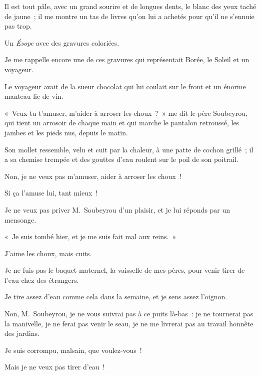 \documentclass[french,twoside]{book} %
\def\mednobreak{\ifdim\lastskip<\medskipamount
  \removelastskip\nopagebreak\medskip\fi}
\newcommand{\labelblock}[1]{\medbreak{\noindent\color{rubric}\bfseries #1}\par\mednobreak}
\begin{document}
Il est tout pâle, avec un grand sourire et de longues dents, le blanc des yeux taché de jaune ; il me montre un tas de livres qu’on lui a achetés pour qu’il ne s’ennuie pas trop.\par
Un \emph{Ésope} avec des gravures coloriées.\par
Je me rappelle encore une de ces gravures qui représentait Borée, le Soleil et un voyageur.\par
Le voyageur avait de la sueur chocolat qui lui coulait sur le front et un énorme manteau lie-de-vin.\par
\bigbreak
\noindent « Veux-tu t’amuser, m’aider à arroser les choux ? » me dit le père Soubeyrou, qui tient un arrosoir de chaque main et qui marche le pantalon retroussé, les jambes et les pieds nus, depuis le matin.\par
Son mollet ressemble, velu et cuit par la chaleur, à une patte de cochon grillé ; il a sa chemise trempée et des gouttes d’eau roulent sur le poil de son poitrail.\par
Non, je ne veux pas m’amuser, aider à arroser les choux !\par
Si ça l’amuse lui, tant mieux !\par
Je ne veux pas priver M. Soubeyrou d’un plaisir, et je lui réponds par un mensonge.\par
« Je suis tombé hier, et je me suis fait mal aux reins. »\par
J’aime les choux, mais cuits.\par
Je ne fuis pas le baquet maternel, la vaisselle de mes pères, pour venir tirer de l’eau chez des étrangers.\par
Je tire assez d’eau comme cela dans la semaine, et je sens assez l’oignon.\par
Non, M. Soubeyrou, je ne vous suivrai pas à ce puits là-bas : je ne tournerai pas la manivelle, je ne ferai pas venir le seau, je ne me livrerai pas au travail honnête des jardins.\par
Je suis corrompu, malsain, que voulez-vous !\par
Mais je ne veux pas tirer d’eau !\par

\labelblock{DEVANT LES MESSAGERIES}
\end{document}

